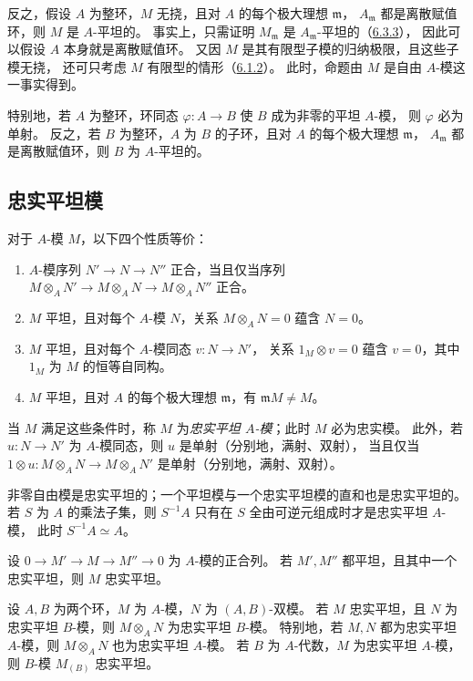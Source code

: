 反之，假设 $A$ 为整环，$M$ 无挠，且对 $A$ 的每个极大理想 $\mathfrak m$，
$A_{\mathfrak m}$ 都是离散赋值环，则 $M$ 是 $A$-平坦的。
事实上，只需证明 $M_{\mathfrak m}$ 是 $A_{\mathfrak m}$-平坦的（\hyperlink{para:0:6.3.3}{6.3.3}），
因此可以假设 $A$ 本身就是离散赋值环。
又因 $M$ 是其有限型子模的归纳极限，且这些子模无挠，
还可只考虑 $M$ 有限型的情形（\hyperlink{para:0:6.1.2}{6.1.2}）。
此时，命题由 $M$ 是自由 $A$-模这一事实得到。

特别地，若 $A$ 为整环，环同态 $\varphi\colon A\to B$ 使 $B$ 成为非零的平坦 $A$-模，
则 $\varphi$ 必为单射。
反之，若 $B$ 为整环，$A$ 为 $B$ 的子环，且对 $A$ 的每个极大理想 $\mathfrak m$，
$A_{\mathfrak m}$ 都是离散赋值环，则 $B$ 为 $A$-平坦的。

\subsection{忠实平坦模}\hypertarget{heading:0:6.4}{}

对于 $A$-模 $M$，以下四个性质等价：
\begin{enumerate}[label=\alph*)]
\item $A$-模序列 $N'\to N\to N''$ 正合，当且仅当序列
$M\otimes_A N'\to M\otimes_A N\to M\otimes_A N''$ 正合。
\item $M$ 平坦，且对每个 $A$-模 $N$，关系 $M\otimes_A N=0$ 蕴含 $N=0$。
\item $M$ 平坦，且对每个 $A$-模同态 $v\colon N\to N'$，
关系 $1_M\otimes v=0$ 蕴含 $v=0$，其中 $1_M$ 为 $M$ 的恒等自同构。
\item $M$ 平坦，且对 $A$ 的每个极大理想 $\mathfrak m$，有 $\mathfrak mM\ne M$。
\end{enumerate}
当 $M$ 满足这些条件时，称 $M$ 为\emph{忠实平坦 $A$-模}；此时 $M$ 必为忠实模。
此外，若 $u\colon N\to N'$ 为 $A$-模同态，则 $u$ 是单射（分别地，满射、双射），
当且仅当 $1\otimes u\colon M\otimes_A N\to M\otimes_A N'$ 是单射（分别地，满射、双射）。

非零自由模是忠实平坦的；一个平坦模与一个忠实平坦模的直和也是忠实平坦的。
若 $S$ 为 $A$ 的乘法子集，则 $S^{-1}A$ 只有在 $S$ 全由可逆元组成时才是忠实平坦 $A$-模，
此时 $S^{-1}A\simeq A$。

设 $0\to M'\to M\to M''\to0$ 为 $A$-模的正合列。
若 $M',M''$ 都平坦，且其中一个忠实平坦，则 $M$ 忠实平坦。

设 $A,B$ 为两个环，$M$ 为 $A$-模，$N$ 为 $(A,B)$-双模。
若 $M$ 忠实平坦，且 $N$ 为忠实平坦 $B$-模，则 $M\otimes_A N$ 为忠实平坦 $B$-模。
特别地，若 $M,N$ 都为忠实平坦 $A$-模，则 $M\otimes_A N$ 也为忠实平坦 $A$-模。
若 $B$ 为 $A$-代数，$M$ 为忠实平坦 $A$-模，则 $B$-模 $M_{(B)}$ 忠实平坦。

